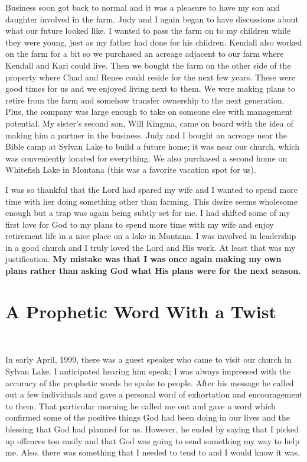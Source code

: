 \documentclass[twoside, 12pt]{book}
\begin{document}
Business soon got back to normal and it was a pleasure to have my son and daughter involved  in the farm. Judy and I again began to have discussions about what our future looked like. I wanted to pass the farm on to my children while they were young, just as my father had done for his children. Kendall also worked on the farm for a bit so we purchased an acreage adjacent to our farm where Kendall and Kari could live. Then we bought the farm on the other side of the property where Chad and Renee could reside for the next few years. These were good times for us and we enjoyed living next to them. We were making plans to retire from the farm and somehow transfer ownership to the next generation. Plus, the company was large enough to take on someone else with management potential. My sister's second son, Will Kingma, came on board with the idea of making him a partner in the business. Judy and I bought an acreage near the Bible camp at Sylvan Lake to build a future home; it was near our church, which was conveniently located for everything. We also purchased a second home on Whitefish Lake in Montana (this was a favorite vacation spot for us).

I was so thankful that the Lord had spared my wife and I wanted to spend more time with her doing something other than farming. This desire seems wholesome enough but a trap was again being subtly set for me. I had shifted some of my first love for God to my plans to spend more time with my wife and enjoy retirement life in a nice place on a lake in Montana. I was involved in leadership in a good church and I truly loved the Lord and His work. At least that was my justification. \textbf{My mistake was that I was once again making my own plans rather than asking God what His plans were for the next season.}


\section{A Prophetic Word With a Twist}
\

In early April, 1999, there was a guest speaker who came to visit our church in Sylvan Lake. I anticipated hearing him speak; I was always impressed with the accuracy of the prophetic words he spoke to people. After his message he called out a few individuals and gave a personal word of exhortation and encouragement to them. That particular morning he called me out and gave a word which confirmed some of the positive things God had been doing in our lives and the blessing that God had planned for us. However, he ended by saying that I picked up offences too easily and that God was going to send something my way to help me. Also, there was something that I needed to tend to and I would know it was.
 
\end{document}
